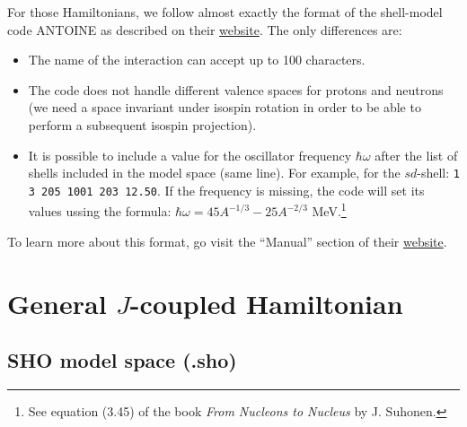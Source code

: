 \documentclass[a4paper,11pt]{article}
\renewcommand{\tt}[1]{\texttt{#1}}
\begin{document}
For those Hamiltonians, we follow almost exactly the format of the shell-model code ANTOINE as described on their
\href{http://www.iphc.cnrs.fr/nutheo/code\_antoine/menu.html}{website}. 
The only differences are:
\begin{itemize}
  \item The name of the interaction can accept up to 100 characters.
  \item The code does not handle different valence spaces for protons and neutrons (we need a space invariant under
  isospin rotation in order to be able to perform a subsequent isospin projection).
  \item It is possible to include a value for the oscillator frequency $\hbar \omega$ after the list of shells included in the model space (same line).
  For example, for the $sd$-shell: \tt{1 3 205  1001  203  12.50}. If the frequency is missing, the code will set its values ussing the
  formula: $\hbar \omega = 45 A^{-1/3} - 25 A^{-2/3}$ MeV.\footnote{See equation (3.45) of the book \textit{From Nucleons to Nucleus} by J. Suhonen.}
\end{itemize}
To learn more about this format, go visit the ``Manual'' section of their
\href{http://www.iphc.cnrs.fr/nutheo/code\_antoine/menu.html}{website}. 
 

%
%
\section{General $J$-coupled Hamiltonian}

\subsection{SHO model space (.sho)}
\end{document}
